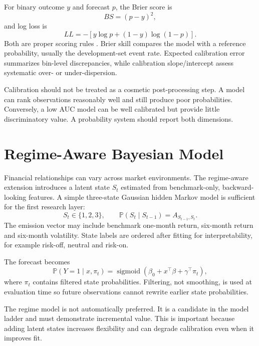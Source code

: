 \documentclass[11pt]{article}
\newcommand{\Prb}{\mathbb{P}}
\newcommand{\sigmoid}{\operatorname{sigmoid}}
\begin{document}
For binary outcome $y$ and forecast $p$, the Brier score is
\begin{equation}
BS=(p-y)^2,
\end{equation}
and log loss is
\begin{equation}
LL=-\left[y\log p+(1-y)\log(1-p)\right].
\end{equation}
Both are proper scoring rules \citep{brier1950verification,gneiting2007proper}. Brier skill compares the model with a reference probability, usually the development-set event rate. Expected calibration error summarizes bin-level discrepancies, while calibration slope/intercept assess systematic over- or under-dispersion.

Calibration should not be treated as a cosmetic post-processing step. A model can rank observations reasonably well and still produce poor probabilities. Conversely, a low AUC model can be well calibrated but provide little discriminatory value. A probability system should report both dimensions.

\section{Regime-Aware Bayesian Model}
Financial relationships can vary across market environments. The regime-aware extension introduces a latent state $S_t$ estimated from benchmark-only, backward-looking features. A simple three-state Gaussian hidden Markov model is sufficient for the first research layer:
\begin{equation}
S_t\in\{1,2,3\},\qquad \Prb(S_t\mid S_{t-1})=A_{S_{t-1},S_t}.
\end{equation}
The emission vector may include benchmark one-month return, six-month return and six-month volatility. State labels are ordered after fitting for interpretability, for example risk-off, neutral and risk-on.

The forecast becomes
\begin{equation}
\Prb(Y=1\mid x,\pi_t)=\sigmoid(\beta_0+x^\top\beta+\gamma^\top\pi_t),
\end{equation}
where $\pi_t$ contains filtered state probabilities. Filtering, not smoothing, is used at evaluation time so future observations cannot rewrite earlier state probabilities.

The regime model is not automatically preferred. It is a candidate in the model ladder and must demonstrate incremental value. This is important because adding latent states increases flexibility and can degrade calibration even when it improves fit.
\end{document}

